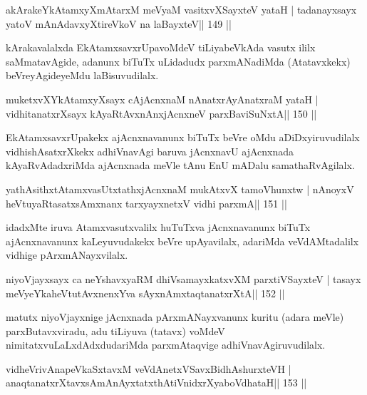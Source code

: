 \begin{shl}
akArakeYkAtamxyXmAtarxM meVyaM vasitxvXSayxteV yataH |
tadanayxsayx yatoV mAnAdavxyXtireVkoV na laBayxteV\hfill || 149 ||
\end{shl}

\begin{artha}
kArakavalalxda EkAtamxsavxrUpavoMdeV tiLiyabeVkAda vasutx ililx saMmatavAgide, adanunx biTuTx uLidadudx parxmANadiMda (Atatavxkekx) beVreyAgideyeMdu laBisuvudilalx.
\end{artha}

\begin{shl}
muketxvXYkAtamxyXsayx cAjAcnxnaM nAnatxrAyAnatxraM yataH |
vidhitanatxrXsayx kAyaRtAvxnAnxjAcnxneV parxBaviSuNxtA\hfill || 150 ||
\end{shl}

\begin{artha}
EkAtamxsavxrUpakekx ajAcnxnavanunx biTuTx beVre oMdu aDiDxyiruvudilalx vidhishAsatxrXkekx adhiVnavAgi baruva jAcnxnavU ajAcnxnada kAyaRvAdadxriMda ajAcnxnada meVle tAnu EnU mADalu samathaRvAgilalx.
\end{artha}

\begin{shl}
yathAsithxtAtamxvasUtxtathxjAcnxnaM mukAtxvX tamoVhunxtw |
nAnoyxV heVtuyaRtasatxsAmxnanx tarxyayxnetxV vidhi parxmA\hfill || 151 ||
\end{shl}

\begin{artha}
idadxMte iruva Atamxvasutxvalilx huTuTxva jAcnxnavanunx biTuTx ajAcnxnavanunx kaLeyuvudakekx beVre upAyavilalx, adariMda veVdAMtadalilx vidhige pArxmANayxvilalx.
\end{artha}

\begin{shl}
niyoVjayxsayx ca neYshavxyaRM dhiVsamayxkatxvXM parxtiVSayxteV |
tasayx meVyeYkaheVtutAvxnenxYva sAyxnAmxtaqtanatxrXtA\hfill || 152 ||
\end{shl}

\begin{artha}
matutx niyoVjayxnige jAcnxnada pArxmANayxvanunx kuritu (adara meVle) parxButavxviradu, adu tiLiyuva (tatavx) voMdeV nimitatxvuLaLxdAdxdudariMda parxmAtaqvige adhiVnavAgiruvudilalx.
\end{artha}


\begin{shl}
vidheVrivAnapeVkaSxtavxM veVdAnetxVSavxBidhAshurxteVH |
anaqtanatxrXtavxsAmAnAyxtatxthA\s tiVnidxrXyaboVdhataH\hfill || 153 ||
\end{shl}

